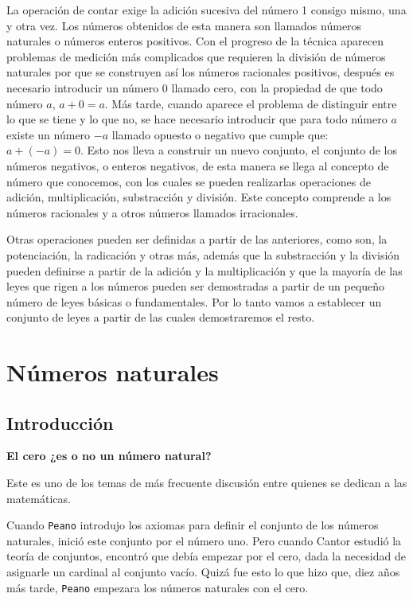 La operación de contar exige la adición sucesiva del número 1 consigo
mismo, una y otra vez. Los números obtenidos de esta manera son llamados
números naturales o números enteros positivos. Con el progreso de
la técnica aparecen problemas de medición más complicados que requieren
la división de números naturales por que se construyen así los números
racionales positivos, después es necesario introducir un número $0$
llamado cero, con la propiedad de que todo número $a$, $a+0=a.$
Más tarde, cuando aparece el problema de distinguir entre lo que se
tiene y lo que no, se hace necesario introducir que para todo número
$a$ existe un número $-a$ llamado opuesto o negativo que cumple
que: $a+\left(-a\right)=0.$ Esto nos lleva a construir un nuevo conjunto,
el conjunto de los números negativos, o enteros negativos, de esta
manera se llega al concepto de número que conocemos, con los cuales
se pueden realizarlas operaciones de adición, multiplicación, substracción
y división. Este concepto comprende a los números racionales y a otros
números llamados irracionales.

Otras operaciones pueden ser definidas a partir de las anteriores,
como son, la potenciación, la radicación y otras más, además que la
substracción y la división pueden definirse a partir de la adición
y la multiplicación y que la mayoría de las leyes que rigen a los
números pueden ser demostradas a partir de un pequeño número de leyes
básicas o fundamentales. Por lo tanto vamos a establecer un conjunto
de leyes a partir de las cuales demostraremos el resto.

\section{Números naturales}

\subsection{Introducción}

\textbf{El cero ¿es o no un número natural? }

Este es uno de los temas de más frecuente discusión entre quienes
se dedican a las matemáticas. 

Cuando \texttt{Peano} introdujo los axiomas para definir el conjunto
de los números naturales, inició este conjunto por el número uno.
Pero cuando Cantor estudió la teoría de conjuntos, encontró que debía
empezar por el cero, dada la necesidad de asignarle un cardinal al
conjunto vacío. Quizá fue esto lo que hizo que, diez años más tarde,
\texttt{Peano} empezara los números naturales con el cero.

